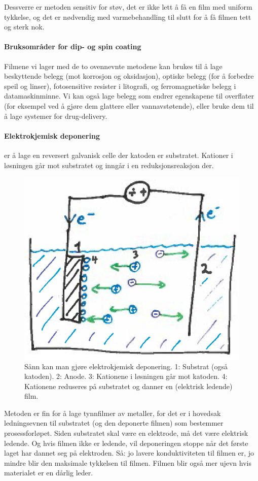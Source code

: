 Dessverre er metoden sensitiv for støv, det er ikke lett å få en film med uniform tykkelse, og det er nødvendig med varmebehandling til slutt for å få filmen tett og sterk nok.

\paragraph{Bruksområder for dip- og spin coating} Filmene vi lager med de to ovennevnte metodene kan brukes til å lage beskyttende belegg (mot korrosjon og oksidasjon), optiske belegg (for å forbedre speil og linser), fotosensitive resister i litografi, og ferromagnetiske belegg i datamaskinminne. Vi kan også lage belegg som endrer egenskapene til overflater (for eksempel ved å gjøre dem glattere eller vannavstøtende), eller bruke dem til å lage systemer for drug-delivery.

\paragraph{Elektrokjemisk deponering} er å lage en reversert galvanisk celle der katoden er substratet. Kationer i løsningen går mot substratet og inngår i en reduksjonsreaksjon der. 
\begin{figure}[H]
\bmd\centering
\includegraphics[width=0.6\linewidth]{metodefigs/elkjemdep.png}
\caption{Sånn kan man gjøre elektrokjemisk deponering. 1: Substrat (også katoden). 2: Anode. 3: Kationene i løsningen går mot katoden. 4: Kationene reduseres på substratet og danner en (elektrisk ledende) film.}
\emd\end{figure}
Metoden er fin for å lage tynnfilmer av metaller, for det er i hovedsak ledningsevnen til substratet (og den deponerte filmen) som bestemmer prosessforløpet. Siden substratet skal være en elektrode, må det være elektrisk ledende. Og hvis filmen ikke er ledende, vil deponeringen stoppe når det første laget har dannet seg på elektroden. Så: jo lavere konduktiviteten til filmen er, jo mindre blir den maksimale tykkelsen til filmen. Filmen blir også mer ujevn hvis materialet er en dårlig leder.

